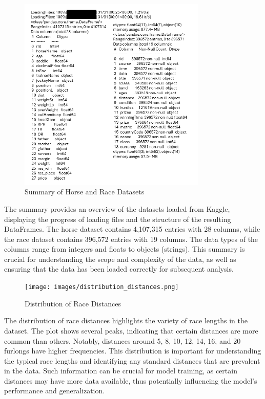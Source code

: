 \documentclass{article}
\begin{document}
\begin{figure}[H]
    \centering
    \includegraphics[width=0.8\textwidth]{images/data_summary.png} %
    \caption{Summary of Horse and Race Datasets}
    \label{fig:data_summary}
\end{figure}

The summary provides an overview of the datasets loaded from Kaggle, displaying the progress of loading files and the structure of the resulting DataFrames. The horse dataset contains 4,107,315 entries with 28 columns, while the race dataset contains 396,572 entries with 19 columns. The data types of the columns range from integers and floats to objects (strings). This summary is crucial for understanding the scope and complexity of the data, as well as ensuring that the data has been loaded correctly for subsequent analysis.

\begin{figure}[H]
    \centering
    \texttt{[image: images/distribution\_distances.png]} %
    \caption{Distribution of Race Distances}
    \label{fig:distribution_distances}
\end{figure}

The distribution of race distances highlights the variety of race lengths in the dataset. The plot shows several peaks, indicating that certain distances are more common than others. Notably, distances around 5, 8, 10, 12, 14, 16, and 20 furlongs have higher frequencies. This distribution is important for understanding the typical race lengths and identifying any standard distances that are prevalent in the data. Such information can be crucial for model training, as certain distances may have more data available, thus potentially influencing the model's performance and generalization.
\end{document}
